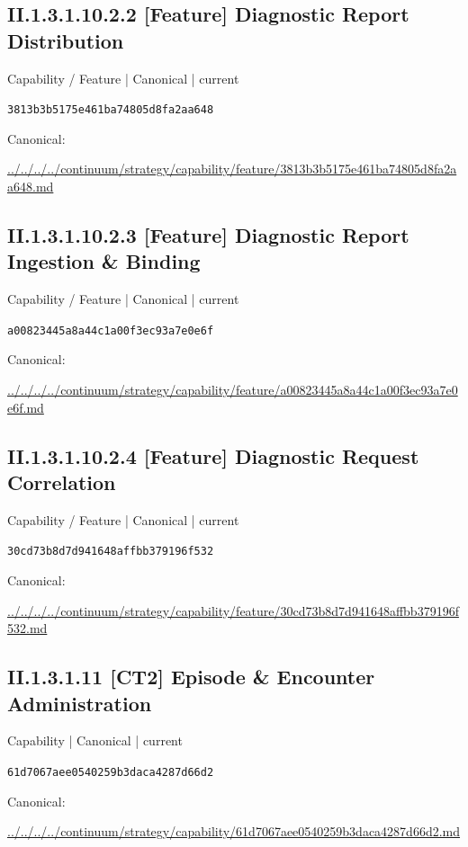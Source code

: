 \documentclass[10pt,a4paper]{article}
\begin{document}
\subsection*{II.1.3.1.10.2.2 [Feature] Diagnostic Report Distribution}
{\small Capability / Feature | Canonical | current}\par
\texttt{3813b3b5175e461ba74805d8fa2aa648}\par
Canonical: \par
{\footnotesize\url{../../../../continuum/strategy/capability/feature/3813b3b5175e461ba74805d8fa2aa648.md}}\par
\subsection*{II.1.3.1.10.2.3 [Feature] Diagnostic Report Ingestion \& Binding}
{\small Capability / Feature | Canonical | current}\par
\texttt{a00823445a8a44c1a00f3ec93a7e0e6f}\par
Canonical: \par
{\footnotesize\url{../../../../continuum/strategy/capability/feature/a00823445a8a44c1a00f3ec93a7e0e6f.md}}\par
\subsection*{II.1.3.1.10.2.4 [Feature] Diagnostic Request Correlation}
{\small Capability / Feature | Canonical | current}\par
\texttt{30cd73b8d7d941648affbb379196f532}\par
Canonical: \par
{\footnotesize\url{../../../../continuum/strategy/capability/feature/30cd73b8d7d941648affbb379196f532.md}}\par
\subsection*{II.1.3.1.11 [CT2] Episode \& Encounter Administration}
{\small Capability | Canonical | current}\par
\texttt{61d7067aee0540259b3daca4287d66d2}\par
Canonical: \par
{\footnotesize\url{../../../../continuum/strategy/capability/61d7067aee0540259b3daca4287d66d2.md}}\par
\end{document}
